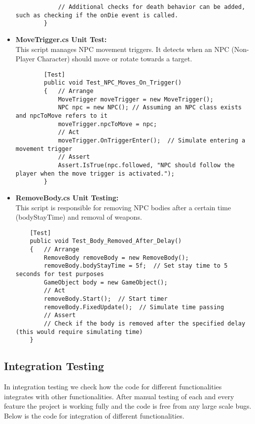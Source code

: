 \begin{itemize}
\begin{lstlisting}
			// Additional checks for death behavior can be added, such as checking if the onDie event is called.
		}
	\end{lstlisting}
	\item \textbf{ MoveTrigger.cs Unit Test:}
	\\
	This script manages NPC movement triggers. It detects when an NPC (Non-Player Character) should move or rotate towards a target.
	\begin{lstlisting}
		[Test]
		public void Test_NPC_Moves_On_Trigger()
		{   // Arrange
			MoveTrigger moveTrigger = new MoveTrigger();
			NPC npc = new NPC(); // Assuming an NPC class exists and npcToMove refers to it
			moveTrigger.npcToMove = npc;
			// Act
			moveTrigger.OnTriggerEnter();  // Simulate entering a movement trigger
			// Assert
			Assert.IsTrue(npc.followed, "NPC should follow the player when the move trigger is activated.");
		}
	\end{lstlisting}
	\item \textbf{RemoveBody.cs Unit Testing:}
	\\
	This script is responsible for removing NPC bodies after a certain time (bodyStayTime) and removal of weapons.
	\begin{lstlisting}
	[Test]
	public void Test_Body_Removed_After_Delay()
	{   // Arrange
		RemoveBody removeBody = new RemoveBody();
		removeBody.bodyStayTime = 5f;  // Set stay time to 5 seconds for test purposes
		GameObject body = new GameObject();
		// Act
		removeBody.Start();  // Start timer
		removeBody.FixedUpdate();  // Simulate time passing
		// Assert
		// Check if the body is removed after the specified delay (this would require simulating time)
	}
	\end{lstlisting}
\end{itemize}

\subsection{Integration Testing}
In integration testing we check how the code for different functionalities integrates with other functionalities. After manual testing of each and every feature the project is working fully and the code is free from any large scale bugs. Below is the code for integration of different functionalities.

